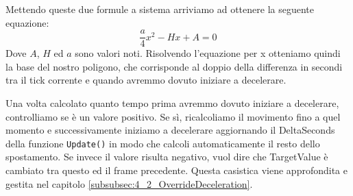 \documentclass[main.tex]{subfiles}
\begin{document}
\begin{itemize}
    Mettendo queste due formule a sistema arriviamo ad ottenere la seguente equazione:
    \[\frac{a}{4}x^2 - Hx + A = 0\]
    Dove $A$, $H$ ed $a$ sono valori noti. Risolvendo l'equazione per x otteniamo quindi la base del nostro poligono, che corrisponde al doppio della differenza in secondi tra il tick corrente e quando avremmo dovuto iniziare a decelerare.
\end{itemize}

\noindent Una volta calcolato quanto tempo prima avremmo dovuto iniziare a decelerare, controlliamo se è un valore positivo. Se sì, ricalcoliamo il movimento fino a quel momento e successivamente iniziamo a decelerare aggiornando il DeltaSeconds della funzione \lstinline{Update()} in modo che calcoli automaticamente il resto dello spostamento. \newline
Se invece il valore risulta negativo, vuol dire che TargetValue è cambiato tra questo ed il frame precedente. Questa casistica viene approfondita e gestita nel capitolo  \ref{subsubsec:4_2_OverrideDeceleration}.
\end{document}
